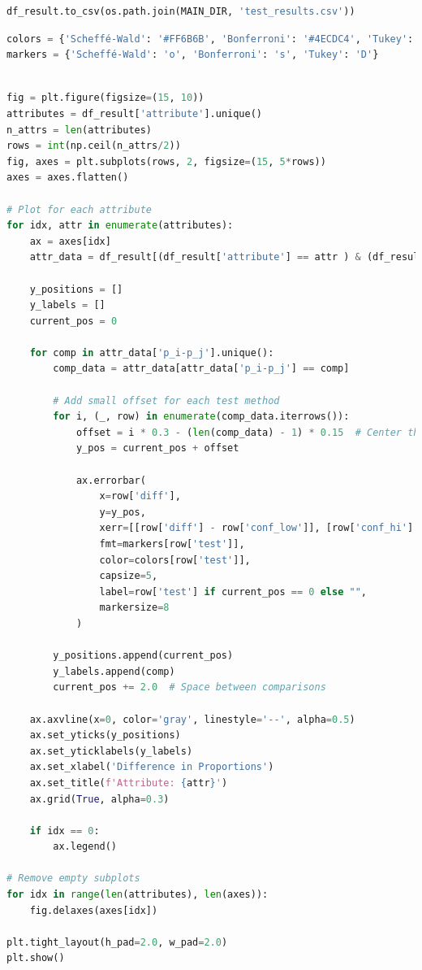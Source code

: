 \begin{lstlisting}[language=Python]
df_result.to_csv(os.path.join(MAIN_DIR, 'test_results.csv'))
\end{lstlisting}

\begin{lstlisting}[language=Python]
colors = {'Scheffé-Wald': '#FF6B6B', 'Bonferroni': '#4ECDC4', 'Tukey': '#45B7D1'}
markers = {'Scheffé-Wald': 'o', 'Bonferroni': 's', 'Tukey': 'D'}
\end{lstlisting}

\begin{lstlisting}[language=Python]

fig = plt.figure(figsize=(15, 10))
attributes = df_result['attribute'].unique()
n_attrs = len(attributes)
rows = int(np.ceil(n_attrs/2))
fig, axes = plt.subplots(rows, 2, figsize=(15, 5*rows))
axes = axes.flatten()

# Plot for each attribute
for idx, attr in enumerate(attributes):
    ax = axes[idx]
    attr_data = df_result[(df_result['attribute'] == attr ) & (df_result['p_i-p_j'] != 'TL-TM')]
    
    y_positions = []
    y_labels = []
    current_pos = 0
    
    for comp in attr_data['p_i-p_j'].unique():
        comp_data = attr_data[attr_data['p_i-p_j'] == comp]
        
        # Add small offset for each test method
        for i, (_, row) in enumerate(comp_data.iterrows()):
            offset = i * 0.3 - (len(comp_data) - 1) * 0.15  # Center the methods
            y_pos = current_pos + offset
            
            ax.errorbar(
                x=row['diff'],
                y=y_pos,
                xerr=[[row['diff'] - row['conf_low']], [row['conf_hi'] - row['diff']]],
                fmt=markers[row['test']],
                color=colors[row['test']],
                capsize=5,
                label=row['test'] if current_pos == 0 else "",
                markersize=8
            )
            
        y_positions.append(current_pos)
        y_labels.append(comp)
        current_pos += 2.0  # Space between comparisons
    
    ax.axvline(x=0, color='gray', linestyle='--', alpha=0.5)
    ax.set_yticks(y_positions)
    ax.set_yticklabels(y_labels)
    ax.set_xlabel('Difference in Proportions')
    ax.set_title(f'Attribute: {attr}')
    ax.grid(True, alpha=0.3)
    
    if idx == 0:
        ax.legend()

# Remove empty subplots
for idx in range(len(attributes), len(axes)):
    fig.delaxes(axes[idx])

plt.tight_layout(h_pad=2.0, w_pad=2.0)
plt.show()
\end{lstlisting}

